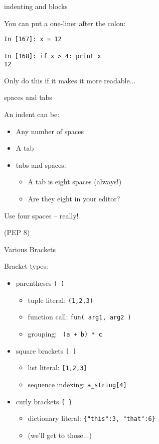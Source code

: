 \documentclass{beamer}
\begin{document}
\begin{frame}[fragile]{indenting and blocks}

{\Large  You can put a one-liner after the colon:}

\vfill
\begin{verbatim}
In [167]: x = 12

In [168]: if x > 4: print x
12
\end{verbatim}

\vfill
{\Large Only do this if it makes it more readable...}

\end{frame}


\begin{frame}{spaces and tabs}

{\Large  An indent can be:}
\begin{itemize}
  \item Any number of spaces
  \item A tab
  \item tabs and spaces:
    \begin{itemize}
      \item A tab is eight spaces (always!)
      \item Are they eight in your editor?
    \end{itemize}
\end{itemize}

\vfill
{\LARGE Use four spaces -- really!}

\vfill
(PEP 8)

\end{frame}


\begin{frame}[fragile]{Various Brackets}

{\Large Bracket types:}

\begin{itemize}
  \item parentheses \verb+( )+
    \begin{itemize}
      \item tuple literal: \verb+(1,2,3)+
      \item function call: \verb+fun( arg1, arg2 )+
      \item grouping: \verb| (a + b) * c |
    \end{itemize}
  \item square brackets \verb+[ ]+
    \begin{itemize}
      \item list literal: \verb+[1,2,3]+
      \item sequence indexing: \verb+a_string[4]+
    \end{itemize}
  \item curly brackets \verb+{ }+
    \begin{itemize}
      \item dictionary literal: \verb+{"this":3, "that":6}+
      \item (we'll get to those...)
    \end{itemize}
\end{itemize}

\end{frame}
\end{document}
